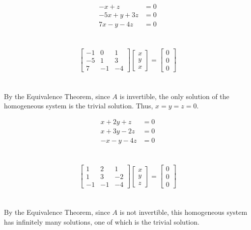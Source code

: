 \documentclass[12pt]{article}
\begin{document}
  \begin{example} \begin{align*} -x + z &= 0 \\ -5x +y + 3z &= 0 \\ 7x -y - 4z &= 0 \end{align*} \\~\\ 
 $$ \begin{bmatrix} -1 & 0 & 1 \\ -5 & 1 & 3 \\ 7 & -1 & -4 \end{bmatrix} \begin{bmatrix} x \\ y \\ x \end{bmatrix}  = \begin{bmatrix} 0 \\ 0 \\ 0 \end{bmatrix} $$ \\~\\ By the Equivalence Theorem, since $A$ is  invertible, the only solution of the homogeneous system is the trivial solution. Thus, $ x = y = z = 0$. \end{example}
  \begin{example} \begin{align*} x + 2y + z &= 0 \\ x + 3y - 2z &= 0 \\ -x - y - 4z &= 0 \end{align*} \\~\\
 $$ \begin{bmatrix} 1 & 2 & 1 \\ 1 & 3 & -2 \\ -1 & -1 & -4 \end{bmatrix} \begin{bmatrix} x \\ y \\ z \end{bmatrix} = \begin{bmatrix} 0 \\ 0 \\ 0 \end{bmatrix} $$ \\~\\ By the Equivalence Theorem, since $A$ is not invertible, this homogeneous system has infinitely many solutions, one of which is the trivial solution. \end{example} 
  
\end{document}
